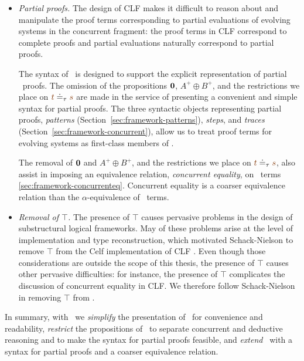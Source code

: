 \begin{itemize}
\item{\it Partial proofs.} The design of CLF makes it difficult to
  reason about and manipulate the proof terms corresponding to partial
  evaluations of evolving systems in the concurrent fragment: the proof
  terms in CLF correspond to complete proofs and partial evaluations
  naturally correspond to partial proofs.

  The syntax of \sls~is designed to support the explicit
  representation of partial \ollll~proofs. The omission of the
  propositions $\mathbf{0}$, $A^+ \oplus B^+$, and the restrictions we
  place on $\lf{t} \doteq_\tau \lf{s}$ are made in the service of
  presenting a convenient and simple syntax for partial proofs. The
  three syntactic objects representing partial proofs, {\it patterns}
  (Section~\ref{sec:framework-patterns}), {\it steps}, and {\it
    traces} (Section~\ref{sec:framework-concurrent}), allow us to
  treat proof terms for evolving systems as first-class members of
  \sls.

  The removal of $\mathbf{0}$ and $A^+ \oplus B^+$, and the restrictions we
  place on $\lf{t} \doteq_\tau \lf{s}$, also assist in imposing an
  equivalence relation, {\it concurrent equality}, on \sls~terms
  \ref{sec:framework-concurrenteq}. Concurrent equality is a coarser
  equivalence relation than the $\alpha$-equivalence of \ollll~terms.

\item{\it Removal of $\top$.} The presence of $\top$ causes pervasive
  problems in the design of substructural logical frameworks. May of
  these problems arise at the level of implementation and type
  reconstruction, which motivated Schack-Nielson to remove $\top$ from
  the Celf implementation of CLF
  \cite{schacknielsen11implementing}. Even though those considerations
  are outside the scope of this thesis, the presence of $\top$ causes
  other pervasive difficulties: for instance, the presence of $\top$
  complicates the discussion of concurrent equality in CLF. We therefore
  follow Schack-Nielson in removing $\top$ from \sls.

\end{itemize}
\smallskip
\noindent
In summary, with \sls~we {\it simplify} the presentation of \ollll~for
convenience and readability, {\it restrict} the propositions of
\ollll~to separate concurrent and deductive reasoning and to make the
syntax for partial proofs feasible, and {\it extend} \ollll~with a
syntax for partial proofs and a coarser equivalence relation.

